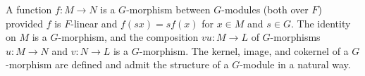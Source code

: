A function $f: M \to N$ is a $G$-morphism between $G$-modules (both over $F$) provided $f$ is $F$-linear and $f(sx) = sf(x)$ for $x \in M$ and $s \in G$. The identity on $M$ is a $G$-morphism, and the composition $vu: M \to L$ of $G$-morphisms $u: M \to N$ and $v: N \to L$ is a $G$-morphism. The kernel, image, and cokernel of a $G$-morphism are defined and admit the structure of a $G$-module in a natural way.
